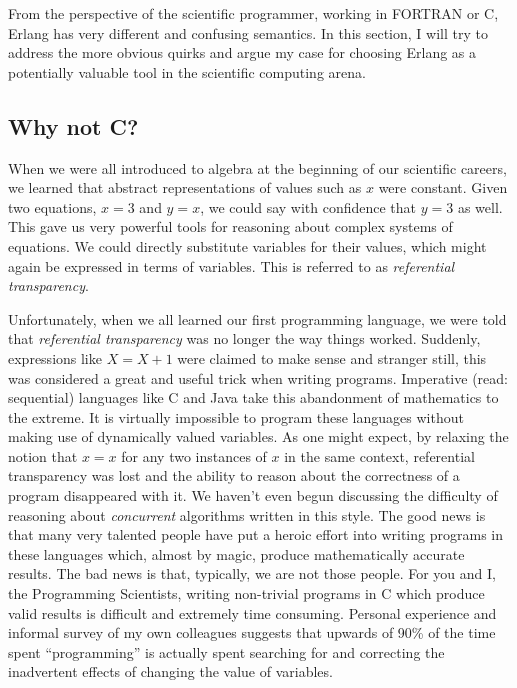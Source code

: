 \documentclass[twocolumn,a4paper,10pt]{article}
\begin{document}
From the perspective of the scientific programmer, working in FORTRAN or C, Erlang has very different and confusing semantics. In this section, I will try to address the more obvious quirks and argue my case for choosing Erlang as a potentially valuable tool in the scientific computing arena.

\subsection{Why not C?}
When we were all introduced to algebra at the beginning of our scientific careers, we learned that abstract representations of values such as $x$ were constant. Given two equations, $x = 3$ and $y = x$, we could say with confidence that $y = 3$ as well. This gave us very powerful tools for reasoning about complex systems of equations. We could directly substitute variables for their values, which might again be expressed in terms of variables. This is referred to as \emph{referential transparency}.

Unfortunately, when we all learned our first programming language, we were told that \emph{referential transparency} was no longer the way things worked. Suddenly, expressions like $X = X + 1$ were claimed to make sense and stranger still, this was considered a great and useful trick when writing programs. Imperative (read: sequential) languages like C and Java take this abandonment of mathematics to the extreme. It is virtually impossible to program these languages without making use of dynamically valued variables. As one might expect, by relaxing the notion that $x = x$ for any two instances of $x$ in the same context, referential transparency was lost and the ability to reason about the correctness of a program disappeared with it. We haven't even begun discussing the difficulty of reasoning about \emph{concurrent} algorithms written in this style. The good news is that many very talented people have put a heroic effort into writing programs in these languages which, almost by magic, produce mathematically accurate results. The bad news is that, typically, we are not those people. For you and I, the Programming Scientists, writing non-trivial programs in C which produce valid results is difficult and extremely time consuming. Personal experience and informal survey of my own colleagues suggests that upwards of 90\% of the time spent ``programming'' is actually spent searching for and correcting the inadvertent effects of changing the value of variables.
\end{document}
